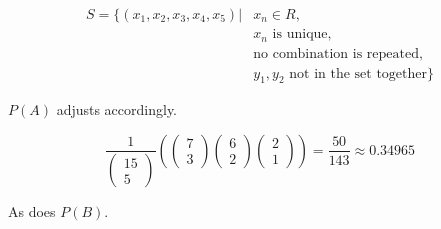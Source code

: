 \documentclass[10pt]{article}
\begin{document}
\begin{easylist}[enumerate]
    \[
        \begin{aligned}
             S = \{ (x_1, x_2, x_3, x_4, x_5) | & x_n \in R,\\
                                                     & x_n \text{ is unique},\\
                                                     & \text{no combination is repeated},\\
                                                     & y_1, y_2 \text{ not in the set together} \}
        \end{aligned}
    \]

    $P(A)$ adjusts accordingly.

    \[
        \frac{1}{\begin{pmatrix}15\\5\end{pmatrix} }
        \left(
            \begin{pmatrix}7\\3\end{pmatrix} \begin{pmatrix}6\\2\end{pmatrix} \begin{pmatrix}2\\1\end{pmatrix}
        \right) = \boxed{\frac{50}{143} \approx 0.34965}
    \]

    As does $P(B)$.


\end{easylist}
\end{document}
